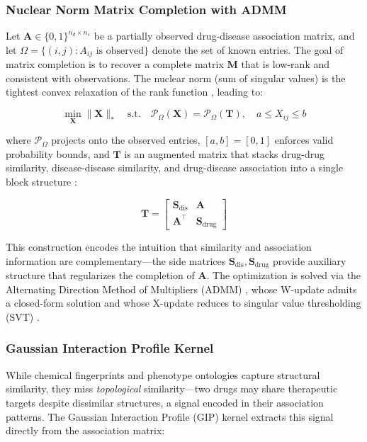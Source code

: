 \documentclass{oup-authoring-template}
\begin{document}
\subsubsection{Nuclear Norm Matrix Completion with ADMM}

Let $\mathbf{A} \in \{0,1\}^{n_d \times n_s}$ be a partially observed drug-disease association matrix, and let $\Omega = \{(i,j) : A_{ij} \text{ is observed}\}$ denote the set of known entries. The goal of matrix completion is to recover a complete matrix $\mathbf{M}$ that is low-rank and consistent with observations. The nuclear norm (sum of singular values) is the tightest convex relaxation of the rank function \cite{candes2009}, leading to:

\begin{equation}
\min_{\mathbf{X}} \|\mathbf{X}\|_* \quad \text{s.t.} \quad \mathcal{P}_\Omega(\mathbf{X}) = \mathcal{P}_\Omega(\mathbf{T}), \quad a \leq X_{ij} \leq b
\label{eq:bnnr}
\end{equation}

where $\mathcal{P}_\Omega$ projects onto the observed entries, $[a,b]=[0,1]$ enforces valid probability bounds, and $\mathbf{T}$ is an augmented matrix that stacks drug-drug similarity, disease-disease similarity, and drug-disease association into a single block structure \cite{yang2019}:

\begin{equation}
\mathbf{T} = \begin{bmatrix} \mathbf{S}_{\text{dis}} & \mathbf{A} \\ \mathbf{A}^\top & \mathbf{S}_{\text{drug}} \end{bmatrix}
\label{eq:augmented}
\end{equation}

This construction encodes the intuition that similarity and association information are complementary---the side matrices $\mathbf{S}_{\text{dis}}, \mathbf{S}_{\text{drug}}$ provide auxiliary structure that regularizes the completion of $\mathbf{A}$. The optimization is solved via the Alternating Direction Method of Multipliers (ADMM) \cite{boyd2011}, whose W-update admits a closed-form solution and whose X-update reduces to singular value thresholding (SVT) \cite{cai2010}.

\subsubsection{Gaussian Interaction Profile Kernel}

While chemical fingerprints and phenotype ontologies capture structural similarity, they miss \emph{topological} similarity---two drugs may share therapeutic targets despite dissimilar structures, a signal encoded in their association patterns. The Gaussian Interaction Profile (GIP) kernel \cite{vanlaarhoven2011} extracts this signal directly from the association matrix:
\end{document}
